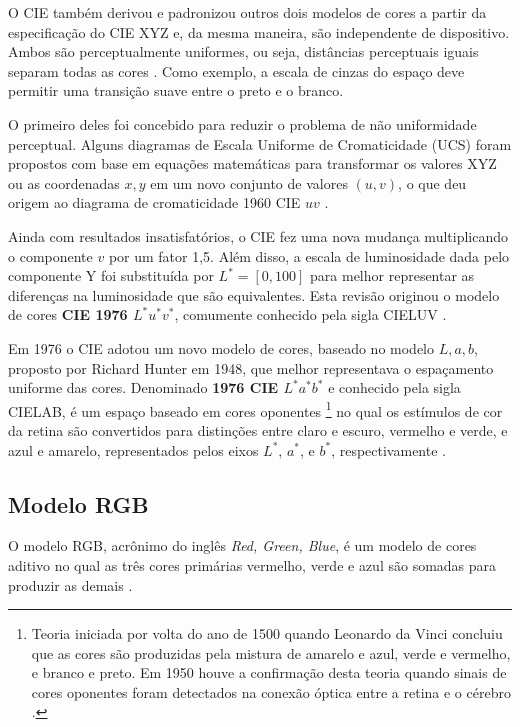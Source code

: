 O CIE também derivou e padronizou outros dois modelos de cores a partir da especificação do CIE XYZ e, da mesma maneira, são independente de dispositivo. Ambos são perceptualmente uniformes, ou seja, distâncias perceptuais iguais separam todas as cores \citep{vezhnevets:03}. Como exemplo, a escala de cinzas do espaço deve permitir uma transição suave entre o preto e o branco.

O primeiro deles foi concebido para reduzir o problema de não uniformidade perceptual. Alguns diagramas de Escala Uniforme de Cromaticidade (UCS) foram propostos com base em equações matemáticas para transformar os valores XYZ ou as coordenadas $x, y$ em um novo conjunto de valores $(u, v)$, o que deu origem ao diagrama de cromaticidade 1960 CIE $uv$ \citep{gevers:12}.

Ainda com resultados insatisfatórios, o CIE fez uma nova mudança multiplicando o componente $v$ por um fator 1,5. Além disso, a escala de luminosidade dada pelo componente Y foi substituída por $L^* = [0, 100]$ para melhor representar as diferenças na luminosidade que são equivalentes. Esta revisão originou o modelo de cores \textbf{CIE 1976 $L^*u^*v^*$}, comumente conhecido pela sigla CIELUV \citep{gevers:12}.

Em 1976 o CIE adotou um novo modelo de cores, baseado no modelo $L, a, b$, proposto por Richard Hunter em 1948, que melhor representava o espaçamento uniforme das cores. Denominado \textbf{1976 CIE $L^*a^*b^*$} e conhecido pela sigla CIELAB, é um espaço baseado em cores oponentes \footnote{Teoria iniciada por volta do ano de 1500 quando Leonardo da Vinci concluiu que as cores são produzidas pela mistura de amarelo e azul, verde e vermelho, e branco e preto. Em 1950 houve a confirmação desta teoria quando sinais de cores oponentes foram detectados na conexão óptica entre a retina e o cérebro \citep{gevers:12}.} no qual os estímulos de cor da retina são convertidos para distinções entre claro e escuro, vermelho e verde, e azul e amarelo, representados pelos eixos $L^*$, $a^*$, e $b^*$, respectivamente \citep{gevers:12}.

\subsection{Modelo RGB}
\label{sec:modelo_cores_rgb}

O modelo RGB, acrônimo do inglês \textit{Red, Green, Blue}, é um modelo de cores aditivo no qual as três cores primárias vermelho, verde e azul são somadas para produzir as demais \citep{gonzalez:02}.

